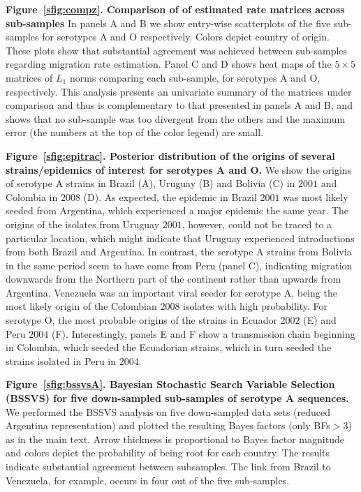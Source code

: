 \documentclass[a4paper,10pt]{article}
\begin{document}
\textbf{Figure~\ref{sfig:compz}. Comparison of of estimated rate matrices across sub-samples}
In panels A and B we show entry-wise scatterplots of the five sub-samples for serotypes A and O respectively.
Colors depict country of origin.
These plots show that substantial agreement was achieved between sub-samples regarding migration rate estimation.
Panel C and D shows heat maps of the $5\times5$ matrices of $L_1$ norms comparing each sub-sample, for serotypes A and O, respectively.
This analysis presents an univariate summary of the matrices under comparison and thus is complementary to that presented in panels A and B, and shows that no sub-sample was too divergent from the others and the maximum error (the numbers at the top of the color legend) are small. 

\textbf{Figure~\ref{sfig:epitrac}. Posterior distribution of the origins of several strains/epidemics of interest for serotypes A and O.}
We show the origins of serotype A strains in  Brazil (A), Uruguay (B) and Bolivia (C) in $2001$ and Colombia in $2008$ (D).
As expected, the epidemic in Brazil $2001$ was most likely seeded from Argentina, which experienced a major epidemic the same year.
The origins of the isolates from Uruguay $2001$, however, could not be traced to a particular location, which might indicate that Uruguay experienced introductions from both Brazil and Argentina.
In contrast, the serotype A strains from Bolivia in the same period seem to have come from Peru (panel C), indicating migration downwards from the Northern part of the continent rather than upwards from Argentina.
Venezuela was an important viral seeder for serotype A, being the most likely origin of the Colombian $2008$ isolates with high probability.
For serotype O, the most probable origins of the strains in Ecuador $2002$ (E) and Peru $2004$ (F).
Interestingly, panels E and F show a transmission chain beginning in Colombia, which seeded the Ecuadorian strains, which in turn seeded the strains isolated in Peru in $2004$.
 
\textbf{Figure~\ref{sfig:bssvsA}. Bayesian Stochastic Search Variable Selection (BSSVS) for five down-sampled sub-samples of serotype A sequences.}
We performed the BSSVS analysis on five down-sampled data sets (reduced Argentina representation) and plotted the resulting Bayes factors (only BFs$>3$) as in the main text.
Arrow thickness is proportional to Bayes factor magnitude and colors depict the probability of being root for each country.
The results indicate substantial agreement between subsamples.
The link from Brazil to Venezuela, for example, occurs in four out of the five sub-samples.
\end{document}

